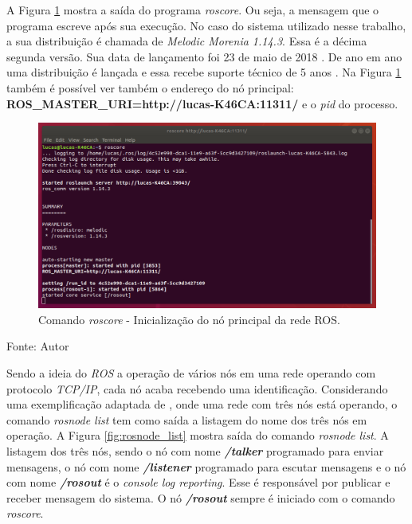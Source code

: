 A Figura \ref{fig:roscore} mostra a saída do programa \textit{roscore}. Ou seja, a mensagem que o programa escreve após sua execução. 
No caso do sistema utilizado nesse trabalho, a sua distribuição é chamada de \textit{Melodic Morenia 1.14.3}. 
Essa é a décima segunda versão. 
Sua data de lançamento foi 23 de maio de 2018 \cite{rosmelodic2019}.
De ano em ano uma distribuição é lançada e essa recebe suporte técnico de 5 anos \cite{rosdist2019}.
Na Figura \ref{fig:roscore} também é possível ver também o endereço do nó principal: \textbf{ROS\_MASTER\_URI=http://lucas-K46CA:11311/} e o \textit{pid} do processo.

\begin{figure}[!htb]
    \centering
    \caption{Comando \textit{roscore} - Inicialização do nó principal da rede ROS.}
    \label{fig:roscore}
    \includegraphics[width=\textwidth]{./img/fundamentacao/roscore.png}
\end{figure}
Fonte: Autor

\pagebreak

Sendo a ideia do \textit{ROS} a operação de vários nós em uma rede operando com protocolo \textit{TCP/IP}, cada nó acaba recebendo uma identificação. 
Considerando uma exemplificação adaptada de , onde uma rede com três nós está operando, o comando \textit{rosnode list} tem como saída a listagem do nome dos três nós em operação. 
A Figura \ref{fig:rosnode_list} mostra saída do comando \textit{rosnode list}. 
A listagem dos três nós, sendo o nó com nome \textbf{\textit{/talker}} programado para enviar mensagens, o nó com nome \textbf{\textit{/listener}} programado para escutar mensagens e o nó com nome \textbf{\textit{/rosout}} é o \textit{console log reporting}. 
Esse é responsável por publicar e receber mensagem do sistema. 
O nó \textbf{\textit{/rosout}} sempre é iniciado com o comando \textit{roscore}.

